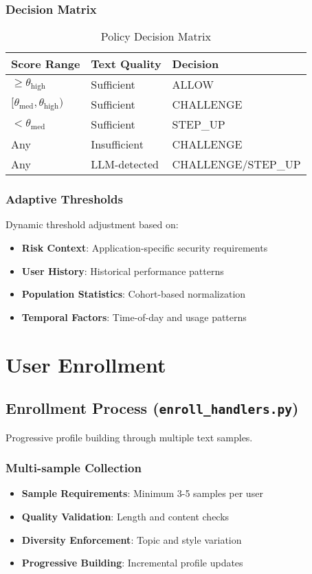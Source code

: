 \documentclass[12pt,a4paper]{article}
\begin{document}
\subsubsection{Decision Matrix}
\begin{table}[h]
\centering
\begin{tabular}{@{}lll@{}}
\toprule
Score Range & Text Quality & Decision \\ \midrule
$\geq \theta_{\text{high}}$ & Sufficient & ALLOW \\
$[\theta_{\text{med}}, \theta_{\text{high}})$ & Sufficient & CHALLENGE \\
$< \theta_{\text{med}}$ & Sufficient & STEP\_UP \\
Any & Insufficient & CHALLENGE \\
Any & LLM-detected & CHALLENGE/STEP\_UP \\
\bottomrule
\end{tabular}
\caption{Policy Decision Matrix}
\end{table}

\subsubsection{Adaptive Thresholds}
Dynamic threshold adjustment based on:
\begin{itemize}
    \item \textbf{Risk Context}: Application-specific security requirements
    \item \textbf{User History}: Historical performance patterns
    \item \textbf{Population Statistics}: Cohort-based normalization
    \item \textbf{Temporal Factors}: Time-of-day and usage patterns
\end{itemize}

\section{User Enrollment}

\subsection{Enrollment Process (\texttt{enroll\_handlers.py})}

Progressive profile building through multiple text samples.

\subsubsection{Multi-sample Collection}
\begin{itemize}
    \item \textbf{Sample Requirements}: Minimum 3-5 samples per user
    \item \textbf{Quality Validation}: Length and content checks
    \item \textbf{Diversity Enforcement}: Topic and style variation
    \item \textbf{Progressive Building}: Incremental profile updates
\end{itemize}
\end{document}
